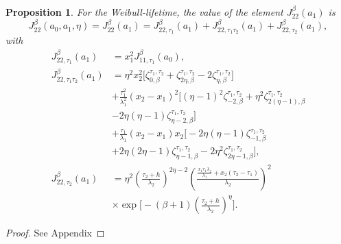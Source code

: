 \documentclass{article}
\newtheorem{proposition}[theorem]{Proposition}
\begin{document}
\begin{proposition}\label{thm:asympa1}
For the Weibull-lifetime, the value of the element $J_{22}^{\beta}(a_1)$ is
\begin{equation*}
J_{22}^{\beta}(a_0,a_1,\eta) = J_{22}^{\beta}(a_1)=J_{22,\tau_1}^{\beta}(a_1)+J_{22,\tau_1\tau_2}^{\beta}(a_1)+J_{22,\tau_2}^{\beta}(a_1),
\end{equation*}
with
\begin{equation}
\begin{aligned}
J_{22,\tau_1}^{\beta}(a_1)
&=x_1^2 J_{11,\tau_1}^{\beta}(a_0),
\\
J_{22,\tau_1\tau_2}^{\beta}(a_1)
&=\eta^2 x_2^2
\Big[
\zeta_{0,\beta}^{\tau_1,\tau_2}
+\zeta_{2\eta,\beta}^{\tau_1,\tau_2}
-2\zeta_{\eta,\beta}^{\tau_1,\tau_2}
\Big]
\\
&
+\frac{\tau_1^2}{\lambda_1^2}(x_2-x_1)^2
\Big[
(\eta-1)^2 \zeta_{-2,\beta}^{\tau_1,\tau_2}
+\eta^2 \zeta_{2(\eta-1),\beta}^{\tau_1,\tau_2}
\\
&
-2\eta(\eta-1)\zeta_{\eta-2,\beta}^{\tau_1,\tau_2}
\Big]
\\
&
+\frac{\tau_1}{\lambda_1}(x_2-x_1)x_2
\Big[
-2\eta(\eta-1)\zeta_{-1,\beta}^{\tau_1,\tau_2}
\\
&
+2\eta(2\eta-1)\zeta_{\eta-1,\beta}^{\tau_1,\tau_2}-2\eta^2\zeta_{2\eta-1,\beta}^{\tau_1,\tau_2}
\Big],
\\
J_{22,\tau_2}^{\beta}(a_1)
&=\eta^2
\left(
\frac{\tau_2+h}{\lambda_2}
\right)^{2\eta-2}
\left(
\frac{\frac{x_1\tau_1\lambda_2}{\lambda_1}
+x_2(\tau_2-\tau_1)}{\lambda_2}
\right)^2
\\
&\times
\exp\!\Bigg[
-(\beta+1)
\left(
\frac{\tau_2+h}{\lambda_2}
\right)^{\eta}
\Bigg].
\end{aligned}  \nonumber
\end{equation}

\end{proposition}
\begin{proof}
See Appendix
\end{proof}
\end{document}
